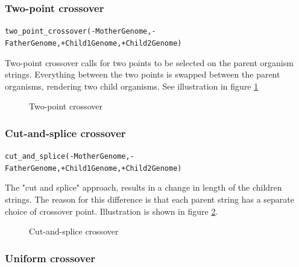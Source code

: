 \documentclass{article}
\begin{document}
\subsubsection{Two-point crossover}

\verb|two_point_crossover(-MotherGenome,-FatherGenome,+Child1Genome,+Child2Genome)|
\medskip

Two-point crossover calls for two points to be selected on the parent organism strings.  Everything between the two points is swapped between the parent organisms, rendering two child organisms.
See illustration in figure \ref{fig:two_point_crossover}

\begin{figure}[htb]
\caption{Two-point crossover}
\label{fig:two_point_crossover}
\centerline{ }
\end{figure}

\subsubsection{Cut-and-splice crossover}
\label{sec:cut_and_splice}

\verb|cut_and_splice(-MotherGenome,-FatherGenome,+Child1Genome,+Child2Genome)|
\medskip

The "cut and splice" approach, results in a change in length of the children strings. The reason for this difference is that each parent string has a separate choice of crossover point.
Illustration is shown in figure \ref{fig:cut_and_splice}.

\begin{figure}[htb]
\caption{Cut-and-splice crossover}
\label{fig:cut_and_splice}
\centerline{ }
\end{figure}

\subsubsection{Uniform crossover}
\end{document}
